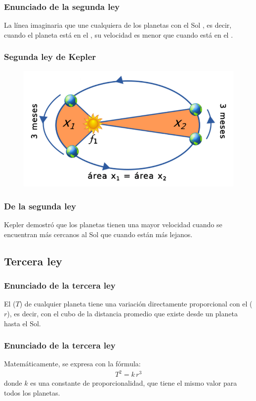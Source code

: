 \documentclass[14pt]{beamer}
\begin{document}
\begin{frame}
\frametitle{Enunciado de la segunda ley}
La línea imaginaria que une cualquiera de los planetas con el Sol , \pause es decir, cuando el planeta está en el , su velocidad es menor que cuando está en el .
\end{frame}
\begin{frame}
\frametitle{Segunda ley de Kepler}
\begin{figure}
    \centering
    \includegraphics[scale=0.45]{Imagenes/Kepler_Leyes_02.png}
\end{figure}
\end{frame}
\begin{frame}
\frametitle{De la segunda ley}
Kepler demostró que los planetas tienen una mayor velocidad cuando se encuentran más cercanos al Sol que cuando están más lejanos.
\end{frame}

\subsection{Tercera ley}


\begin{frame}
\frametitle{Enunciado de la tercera ley}
El  ($T$) de cualquier planeta tiene una variación directamente proporcional con el  ($r$), \pause  es decir, con el cubo de la distancia promedio que existe desde un planeta hasta el Sol.
\end{frame}
\begin{frame}
\frametitle{Enunciado de la tercera ley}    
Matemáticamente, se expresa con la fórmula:
\pause
\begin{align*}
T^{2} = k \, r^{3}
\end{align*}
donde $k$ es una constante de proporcionalidad, que tiene el mismo valor para todos los planetas.
\end{frame}
\end{document}
